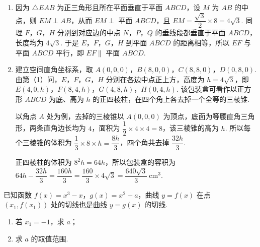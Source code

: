 \begin{solution}
\begin{enumerate}
\item 因为 \(\triangle EAB\) 为正三角形且所在平面垂直于平面 \(ABCD\)，设 \(M\) 为 \(AB\) 的中点，则 \(EM\perp AB\)，从而 \(EM\perp\) 平面 \(ABCD\)，且 \(EM=\dfrac{\sqrt3}2\times8=4\sqrt3\). 同理 \(F\)，\(G\)，\(H\) 分别到对应边的中点 \(N\)，\(P\)，\(Q\) 的垂线段都垂直于平面 \(ABCD\)，长度均为 \(4\sqrt3\). 于是 \(E\)，\(F\)，\(G\)，\(H\) 到平面 \(ABCD\) 的距离相等，所以 \(EF\) 与平面 \(ABCD\) 平行，即 \(EF\parallel\) 平面 \(ABCD\).

\item 建立空间直角坐标系，取 \(A(0,0,0)\)，\(B(8,0,0)\)，\(C(8,8,0)\)，\(D(0,8,0)\). 由第（1）问，\(E\)，\(F\)，\(G\)，\(H\) 分别在各边中点正上方，高度为 \(h=4\sqrt3\)，即 \(E(4,0,h)\)，\(F(8,4,h)\)，\(G(4,8,h)\)，\(H(0,4,h)\). 该包装盒可看作以正方形 \(ABCD\) 为底、高为 \(h\) 的正四棱柱，在四个角上各去掉一个全等的三棱锥.

以角点 \(A\) 处为例，去掉的三棱锥以 \(A(0,0,0)\) 为顶点，底面为等腰直角三角形，两条直角边长均为 \(4\)，面积为 \(\dfrac12\times4\times4=8\)，该三棱锥的高为 \(h\). 所以每个三棱锥的体积为 \(\dfrac13\times8\times h=\dfrac{8h}3\)，四个角共去掉 \(\dfrac{32h}3\).

正四棱柱的体积为 \(8^2h=64h\)，所以包装盒的容积为 \(64h-\dfrac{32h}3=\dfrac{160h}3=\dfrac{160}3\times4\sqrt3=\dfrac{640\sqrt3}3\mathrm{~cm}^3\).
\end{enumerate}
\end{solution}

\begin{problem}
已知函数 \(f(x)=x^3-x\)，\(g(x)=x^2+a\)，曲线 \(y=f(x)\) 在点 \(\left(x_1,f(x_1)\right)\) 处的切线也是曲线 \(y=g(x)\) 的切线.

\begin{enumerate}
\item 若 \(x_1=-1\)，求 \(a\)；
\item 求 \(a\) 的取值范围.
\end{enumerate}
\end{problem}


